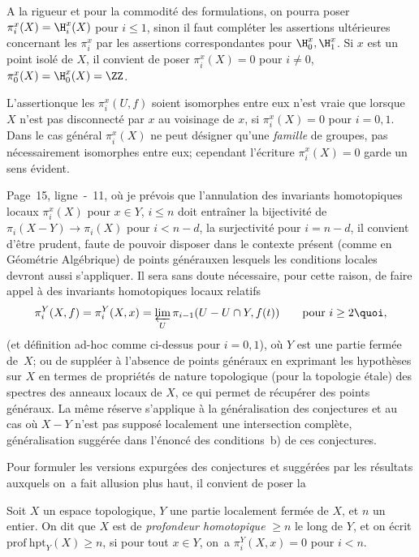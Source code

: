 A la rigueur et pour la commodit\'e des formulations, on pourra poser $\pi_i^x(X)=\H_i^x(X)$ pour $i\leq 1$, sinon il faut compl\'eter les assertions ult\'erieures concernant les $\pi_i^x$ par les assertions correspondantes pour $\H_0^x, \H_1^x$. Si $x$ est un point isol\'e de $X$, il convient de poser $\pi_i^x(X)=0$ pour $i\neq 0$, $\pi_0^x(X)=\H_0^x(X)=\ZZ$.

L'assertion\pageoriginale que les $\pi_i^x(U, f)$ soient isomorphes entre eux n'est vraie que lorsque $X$ n'est pas disconnect\'e par $x$ au voisinage de $x$, \ie si $\pi_i^x(X)=0$ pour $i=0, 1$. Dans le cas g\'en\'eral $\pi_i^x(X)$ ne peut d\'esigner qu'une \emph{famille} de groupes, pas n\'ecessairement isomorphes entre eux; cependant l'\'ecriture $\pi_i^x(X)=0$ garde un sens \'evident.

\label{p26y}Page~15, ligne~-~11, o\`u je pr\'evois que l'annulation des invariants homotopiques locaux $\pi_i^x(X)$ pour $x\in Y$, $i\leq n$ doit entra\^iner la bijectivit\'e de $\pi_i(X-Y)\to\pi_i(X)$ pour $i<n-d$, la surjectivit\'e pour $i=n-d$, il convient d'\^etre prudent, faute de pouvoir disposer dans le contexte pr\'esent (comme en G\'eom\'etrie Alg\'ebrique) de points \og g\'en\'eraux\fg en lesquels les conditions locales devront aussi s'appliquer. Il sera sans doute n\'ecessaire, pour cette raison, de faire appel \`a des invariants homotopiques locaux relatifs
$$
\pi_i^Y(X, f)=\pi_i^Y(X, x)=\varprojlim_U \pi_{i-1}(U-U\cap Y, f(t))\qquad\text{pour }i\geq 2\quoi,
$$
(et d\'efinition {ad-hoc} comme ci-dessus pour $i=0, 1$), o\`u $Y$ est une partie ferm\'ee de~$X$; ou de suppl\'eer \`a l'absence de points g\'en\'eraux en exprimant les hypoth\`eses sur $X$ en termes de propri\'et\'es de nature topologique (pour la topologie \'etale) des spectres des anneaux locaux de $X$, ce qui permet de r\'ecup\'erer des points g\'en\'eraux. La m\^eme r\'eserve s'applique \`a la g\'en\'eralisation des conjectures  et  au cas o\`u $X-Y$ n'est pas suppos\'e localement une intersection compl\`ete, g\'en\'eralisation sugg\'er\'ee dans l'\'enonc\'e des conditions~b) de ces conjectures.

Pour formuler les versions expurg\'ees des conjectures  et  sugg\'er\'ees par les r\'esultats auxquels on~a fait allusion plus haut, il convient de poser la

\begin{supdefinition} \label{XIII.6.1} Soit $X$ un espace topologique, $Y$ une partie localement ferm\'ee de $X$, et $n$ un entier. On dit que $X$ est de \emph{profondeur homotopique} $\geq n$ le long de $Y$, et on \'ecrit $\mathrm{prof\:hpt}_Y(X)\geq n$, si pour tout $x\in Y$, on~a $\pi_i^Y(X, x)=0$ pour $i<n$.
\end{supdefinition}


